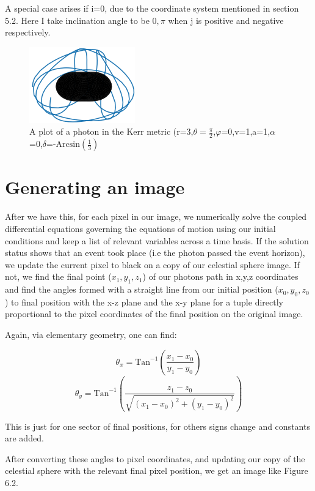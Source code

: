 \documentclass[oneside,openright,frontopenright, singlespacing]{dmathesis}
\begin{document}
\vspace{1em}
	A special case arises if i=0, due to the coordinate system mentioned in section 5.2. Here I take inclination angle to be $0,\pi$ when j is positive and negative respectively.

\begin{figure}[!ht]
	\centering
	\includegraphics[width=0.4\linewidth]{img/3d-kerr-plot}
	\caption{A plot of a photon in the Kerr metric (r=3,$\theta=\frac{\pi}{2}$,$\varphi$=0,v=1,a=1,$\alpha$=0,$\delta$=-$\mbox{Arcsin}(\frac{1}{3})$}
\end{figure}

\section{Generating an image}

	After we have this, for each pixel in our image, we numerically solve the coupled differential equations governing the equations of motion using our initial conditions and keep a list of relevant variables across a time basis. If the solution status shows that an event took place  (i.e the photon passed the event horizon), we update the current pixel to black on a copy of our celestial sphere image. If not, we find the final point ($x_1,y_1,z_1$) of our photons path in x,y,z coordinates and find the angles formed with a straight line from our initial position ($x_0,y_0,z_0$) to final position with the x-z plane and the x-y plane for a tuple directly proportional to the pixel coordinates of the final position on the original image.

\vspace{1em}
	Again, via elementary geometry, one can find:

	\[\theta_{x} = \mbox{Tan}^{-1}\left(\frac{x_1-x_0}{y_1-y_0}\right)\]
	\[\theta_{y} = \mbox{Tan}^{-1}\left(\frac{z_1-z_0}{\sqrt{(x_1-x_0)^2+(y_1-y_0)^2}}\right)\]

\vspace{1em}
	This is just for one sector of final positions, for others signs change and constants are added.

\vspace{1em}
	After converting these angles to pixel coordinates, and updating our copy of the celestial sphere with the relevant final pixel position, we get an image like Figure 6.2.
\end{document}
